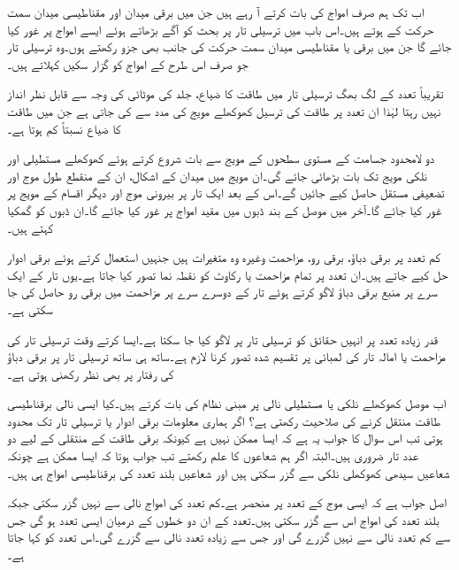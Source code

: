 اب تک ہم صرف    امواج کی بات کرتے آ رہے ہیں جن میں برقی  میدان اور مقناطیسی میدان سمت حرکت کے  ہوتے ہیں۔اس باب میں ترسیلی تار پر بحث کو آگے بڑھاتے ہوئے ایسے امواج پر غور کیا جائے گا جن میں برقی یا مقناطیسی میدان سمت حرکت کی جانب بھی جزو رکھتے ہوں۔وہ ترسیلی تار جو صرف اس طرح کے امواج کو گزار سکیں  کہلاتے ہیں۔

تقریباً  تعدد کے لگ بھگ ترسیلی تار میں طاقت کا ضیاع، جلد کی موٹائی  کی وجہ سے قابل نظر انداز نہیں رہتا لہٰذا ان تعدد پر طاقت کی ترسیل کھوکھلے مویج کی مدد سے کی جاتی ہے جن میں طاقت کا ضیاع نسبتاً کم ہوتا ہے۔
  
دو لامحدود جسامت کے مستوی سطحوں کے مویج سے بات شروع کرتے ہوئے کھوکھلے مستطیلی اور نلکی مویج تک بات بڑھائی جائے گی۔ان مویج میں میدان کے اشکال، ان کے منقطع طول موج اور تضعیفی مستقل  حاصل کیے جائیں گے۔اس کے بعد ایک تار پر بیرونی موج  اور دیگر اقسام کے مویج پر غور کیا جائے گا۔آخر میں موصل کے بند ڈبوں میں مقید امواج پر غور کیا جائے گا۔ان ڈبوں کو گمکیا کہتے ہیں۔

کم تعدد پر برقی دباؤ، برقی رو، مزاحمت وغیرہ وہ متغیرات ہیں جنہیں استعمال کرتے ہوئے برقی ادوار حل کیے جاتے ہیں۔ان تعدد پر تمام مزاحمت یا رکاوٹ کو نقطہ نما تصور کیا جاتا ہے۔یوں تار کے ایک سرے پر منبع برقی دباؤ لاگو کرتے ہوئے تار کے دوسرے سرے پر مزاحمت میں برقی رو حاصل کی جا سکتی ہے۔

قدر زیادہ تعدد پر انہیں حقائق کو ترسیلی تار پر لاگو کیا جا سکتا ہے۔ایسا کرتے وقت ترسیلی تار کی مزاحمت یا امالہ تار کی لمبائی پر تقسیم شدہ  تصور کرنا لازم ہے۔ساتھ ہی ساتھ ترسیلی تار پر برقی دباؤ کی رفتار پر بھی نظر رکھنی ہوتی ہے۔

اب موصل کھوکھلے نلکی یا مستطیلی نالی پر مبنی نظام کی بات کرتے ہیں۔کیا ایسی نالی برقناطیسی طاقت منتقل کرنے کی صلاحیت رکھتی ہے؟ اگر ہماری معلومات برقی ادوار یا ترسیلی تار تک محدود ہوتی تب اس سوال کا جواب یہ ہے کہ ایسا ممکن نہیں ہے کیونکہ برقی طاقت کے منتقلی کے لیے دو عدد تار ضروری ہیں۔البتہ اگر ہم شعاعوں کا علم رکھتے تب جواب ہوتا کہ ایسا ممکن ہے چونکہ شعاعیں سیدھی کھوکھلی نلکی سے گزر سکتی ہیں اور شعاعیں بلند تعدد  کی برقناطیسی امواج ہی ہیں۔

اصل جواب ہے کہ ایسی موج کے تعدد پر منحصر ہے۔کم تعدد کی امواج نالی سے نہیں گزر سکتی جبکہ بلند تعدد کی امواج اس سے گزر سکتی ہیں۔تعدد کے ان دو خطوں کے درمیان ایسی تعدد ہو گی جس سے کم تعدد نالی سے نہیں گزرے گی اور جس سے زیادہ تعدد نالی سے گزرے گی۔اس تعدد کو  کہا جاتا ہے۔ 

